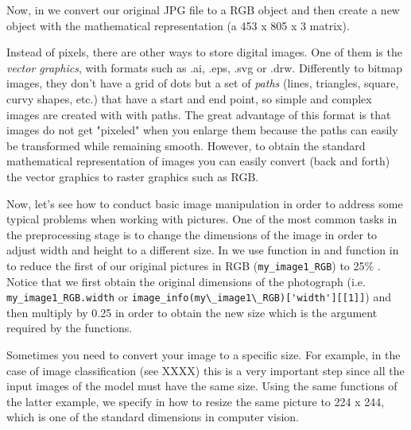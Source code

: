 Now, in  we convert our original JPG file to a RGB object and then create a new object with the mathematical representation (a 453 x 805 x 3 matrix).


Instead of pixels, there are other ways to store digital images. One of them is the \textit{vector graphics}, with formats such as .ai, .eps, .svg or .drw. Differently to bitmap images, they don't have a grid of dots but a set of \textit{paths} (lines, triangles, square, curvy shapes, etc.) that have a start and end point, so simple and complex images are created with with paths. The great advantage of this format is that images do not get "pixeled" when you enlarge them because the paths can easily be transformed 	while remaining smooth. However, to obtain the standard mathematical representation of images you can easily convert (back and forth) the vector graphics to raster graphics such as RGB.

Now, let's see how to conduct basic image manipulation in order to address some typical problems when working with pictures. One of the most common tasks in the preprocessing stage is to change the dimensions of the image in order to adjust width and height to a different size. In  we use  function in  and  function in  to reduce the first of our original pictures in RGB (\texttt{my\_image1\_RGB}) to 25\% . Notice that we first obtain the original dimensions of the photograph (i.e. \texttt{my\_image1\_RGB.width} or \verb|image_info(my\_image1\_RGB)['width'][[1]]|) and then multiply by 0.25 in order to obtain the new size which is the argument required by the functions.


Sometimes you need to convert your image to a specific size. For example, in the case of image classification (see XXXX) this is a very important step since all the input images of the model must have the same size. Using the same functions of the latter example, we specify in  how to resize the same picture to 224 x 244, which is one of the standard dimensions in computer vision. 


